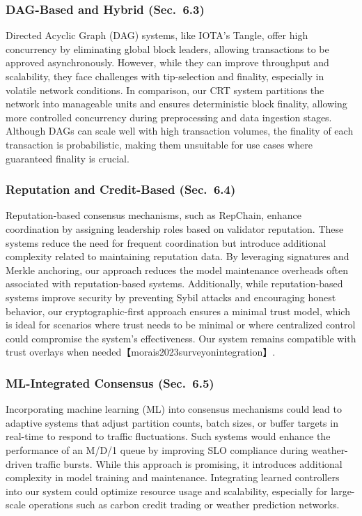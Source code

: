 \subsubsection{DAG-Based and Hybrid (Sec.~6.3)}
Directed Acyclic Graph (DAG) systems, like IOTA’s Tangle, offer high concurrency by eliminating global block leaders, allowing transactions to be approved asynchronously. However, while they can improve throughput and scalability, they face challenges with tip-selection and finality, especially in volatile network conditions. In comparison, our CRT system partitions the network into manageable units and ensures deterministic block finality, allowing more controlled concurrency during preprocessing and data ingestion stages. Although DAGs can scale well with high transaction volumes, the finality of each transaction is probabilistic, making them unsuitable for use cases where guaranteed finality is crucial.

\subsubsection{Reputation and Credit-Based (Sec.~6.4)}
Reputation-based consensus mechanisms, such as RepChain, enhance coordination by assigning leadership roles based on validator reputation. These systems reduce the need for frequent coordination but introduce additional complexity related to maintaining reputation data. By leveraging signatures and Merkle anchoring, our approach reduces the model maintenance overheads often associated with reputation-based systems. Additionally, while reputation-based systems improve security by preventing Sybil attacks and encouraging honest behavior, our cryptographic-first approach ensures a minimal trust model, which is ideal for scenarios where trust needs to be minimal or where centralized control could compromise the system’s effectiveness. Our system remains compatible with trust overlays when needed【morais2023surveyonintegration】.

\subsubsection{ML-Integrated Consensus (Sec.~6.5)}
Incorporating machine learning (ML) into consensus mechanisms could lead to adaptive systems that adjust partition counts, batch sizes, or buffer targets in real-time to respond to traffic fluctuations. Such systems would enhance the performance of an M/D/1 queue by improving SLO compliance during weather-driven traffic bursts. While this approach is promising, it introduces additional complexity in model training and maintenance. Integrating learned controllers into our system could optimize resource usage and scalability, especially for large-scale operations such as carbon credit trading or weather prediction networks.

